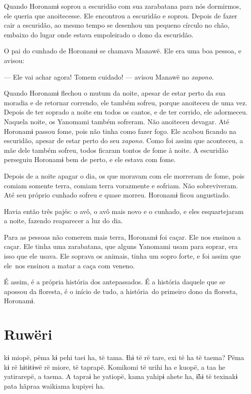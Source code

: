 Quando Horonamɨ soprou a escuridão com sua zarabatana para nós
dormirmos, ele queria que anoitecesse. Ele encontrou a escuridão e
soprou. Depois de fazer cair a escuridão, ao mesmo tempo se desenhou um
pequeno círculo no chão, embaixo do lugar onde estava empoleirado o dono
da escuridão.

O pai do cunhado de Horonamɨ se chamava Manawë. Ele era uma boa pessoa,
e avisou: 

 --- Ele vai achar agora! Tomem cuidado! --- avisou Manawë no \textit{xapono}. 

Quando Horonamɨ flechou o mutum da noite, apesar de estar perto da sua
 moradia e de retornar correndo, ele também sofreu, porque anoiteceu
 de uma vez. Depois de ter soprado a noite em todos os cantos, e de ter
 corrido, ele adormeceu. Naquela noite, os Yanomami também sofreram. Não
 anoiteceu devagar. Até Horonamɨ passou fome, pois não tinha como fazer
 fogo. Ele acabou ficando na escuridão, apesar de estar perto do seu
 \textit{xapono}. Como foi assim que aconteceu, a mãe dele também sofreu, todos
 ficaram tontos de fome à noite. A escuridão perseguiu Horonamɨ bem de
 perto, e ele estava com fome. 

Depois de a noite apagar o dia, os que moravam com ele morreram de
fome, pois comiam somente terra, comiam terra vorazmente e sofriam. Não
sobreviveram. Até seu próprio cunhado sofreu e quase morreu. Horonamɨ
ficou angustiado.

Havia então três pajés: o avô, o avô mais novo e o cunhado, e eles
esquartejaram a noite, fazendo reaparecer a luz do dia. 

Para as pessoas não comerem mais terra, Horonamɨ foi caçar. Ele nos
ensinou a caçar. Ele tinha uma zarabatana, que alguns Yanomami usam para
soprar, era isso que ele usava. Ele soprava os animais, tinha um sopro
forte, e foi assim que ele~nos ensinou a matar a caça com veneno.

 É assim, é a própria história dos antepassados. É a história
daquele que se apossou da floresta, é o início de tudo, a história~do
primeiro dono da floresta, Horonamɨ.

\chapter{Ruwëri}

 kɨ miopë, pëma kɨ pehi taei ha, të tama. Ɨhɨ të rë tare, exi të ha
të taema? Pëma kɨ rë hɨtɨtɨwë rë miore, të taprapë. Komikomi të urihi ha
e kuopë, a taa he yatirarepë, a taema. A tapraɨ he yatiopë, kama yahipɨ
ahete ha, ɨ̃hɨ të texinakɨ pata hãpraa waikiama kupiyei ha. 

